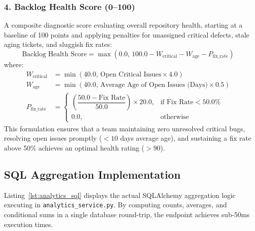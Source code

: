\documentclass[11pt,a4paper]{article}
\begin{document}
\subsubsection{4. Backlog Health Score (0--100)}
A composite diagnostic score evaluating overall repository health, starting at a baseline of 100 points and applying penalties for unassigned critical defects, stale aging tickets, and sluggish fix rates:
\begin{equation}
\text{Backlog Health Score} = \max\left(0.0,\, 100.0 - W_{\text{critical}} - W_{\text{age}} - P_{\text{fix\_rate}}\right)
\end{equation}
where:
\begin{align}
W_{\text{critical}} &= \min\left(40.0,\, \text{Open Critical Issues} \times 4.0\right) \\
W_{\text{age}} &= \min\left(40.0,\, \text{Average Age of Open Issues (Days)} \times 0.5\right) \\
P_{\text{fix\_rate}} &= 
\begin{cases}
\left(\dfrac{50.0 - \text{Fix Rate}}{50.0}\right) \times 20.0, & \text{if } \text{Fix Rate} < 50.0\% \\
0.0, & \text{otherwise}
\end{cases}
\end{align}
This formulation ensures that a team maintaining zero unresolved critical bugs, resolving open issues promptly ($<10$ days average age), and sustaining a fix rate above 50\% achieves an optimal health rating ($>90$).

\subsection{SQL Aggregation Implementation}
Listing~\ref{lst:analytics_sql} displays the actual SQLAlchemy aggregation logic executing in \texttt{analytics\_service.py}. By computing counts, averages, and conditional sums in a single database round-trip, the endpoint achieves sub-50ms execution times.
\end{document}
